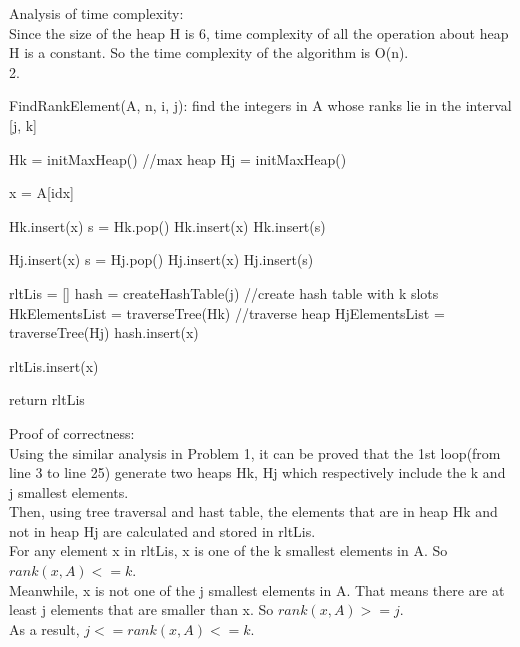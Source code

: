\documentclass{article}
\begin{document}
Analysis of time complexity:\\
Since the size of the heap H is 6, time complexity of all the operation about heap H is a constant. So the time complexity of the algorithm is O(n).\\

2.\\
\begin{algorithm}[H]
	\caption{\newline FindRankElement(A, n, i, j): find the integers in A whose ranks lie in the interval [j, k]}
		
	
	Hk = initMaxHeap() //max heap \;
	Hj = initMaxHeap()\;
	{
		x = A[idx]\;
		            
		{
			Hk.insert(x)\;
		}
		{
			s = Hk.pop()\;
			{
				Hk.insert(x)\;
			}
			{
				Hk.insert(s)\;
			}
		}
		            
		{
			Hj.insert(x)\;
		}
		{
			s = Hj.pop()\;
			{
				Hj.insert(x)\;
			}
			{
				Hj.insert(s)\;
			}
		}
	}
	rltLis = []\;
	hash = createHashTable(j) //create hash table with k slots\;
	HkElementsList = traverseTree(Hk) //traverse heap\;
	HjElementsList = traverseTree(Hj)\;
	{
		hash.insert(x)
	}
	
	{
		{
			rltLis.insert(x)
		}
	}
	
	return rltLis
\end{algorithm}

Proof of correctness:\\
Using the similar analysis in Problem 1, it can be proved that the 1st loop(from line 3 to line 25) generate two heaps Hk, Hj which respectively 
include the k and j smallest elements. \\
Then, using tree traversal and hast table, the elements that are in heap Hk and not in heap Hj are calculated and stored in rltLis.\\
For any element x in rltLis, x is one of the k smallest elements in A. So $rank(x, A) <= k$.\\
Meanwhile, x is not one of the j smallest elements in A. That means there are at least j elements that are smaller than x. So $rank(x, A) >= j$.\\
As a result, $j <= rank(x, A) <= k$.\\
\end{document}
